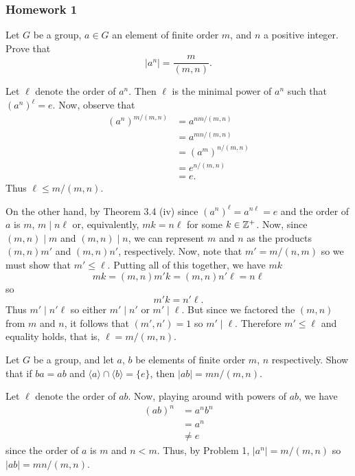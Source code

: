 \newpage

\subsubsection{Homework 1}
\setcounter{exercise}{0}
\setcounter{equation}{0}

\begin{problem}
  Let $G$ be a group, $a\in G$ an element of finite order $m$, and $n$ a
  positive integer. Prove that
  \[
    |a^n|=\frac{m}{(m,n)}.
  \]
\end{problem}
\begin{solution}
  Let $\ell$ denote the order of $a^n$. Then $\ell$ is the minimal power of
  $a^n$ such that ${(a^n)}^\ell=e$. Now, observe that
    \begin{align*}
      {(a^n)}^{m/(m,n)}
      &=a^{nm/(m,n)}\\
      &=a^{mn/(m,n)}\\
      &={(a^m)}^{n/(m,n)}\\
      &=e^{n/(m,n)}\\
      &=e.
    \end{align*}
  Thus $\ell\leq m/(m,n)$.

  On the other hand, by Theorem 3.4 (iv) since ${(a^n)}^\ell=a^{n\ell}=e$
  and the order of $a$ is $m$, $m\mid n\ell$ or, equivalently, $mk=n\ell$
  for some $k\in\mathbb{Z}^+$. Now, since $(m,n)\mid m$ and $(m,n)\mid n$, we can
  represent $m$ and $n$ as the products $(m,n)m'$ and $(m,n)n'$,
  respectively. Now, note that $m'=m/(n,m)$ so we must show that
  $m'\leq\ell$. Putting all of this together, we have $mk$
  \[
    mk=(m,n)m'k=(m,n)n'\ell=n\ell
  \]
  so
  \[
    m'k=n'\ell.
  \]
  Thus $m'\mid n'\ell$ so either $m'\mid n'$ or $m'\mid\ell$. But since we
  factored the $(m,n)$ from $m$ and $n$, it follows that $(m',n')=1$ so
  $m'\mid \ell$. Therefore $m'\leq\ell$ and equality holds, that is,
  $\ell=m/(m,n)$.
\end{solution}

\begin{problem}
  Let $G$ be a group, and let $a$, $b$ be elements of finite order $m$, $n$
  respectively. Show that if $ba=ab$ and
  $\langle a\rangle\cap\langle b\rangle=\{e\}$, then $|ab|=mn/(m,n)$.
\end{problem}
\begin{solution}
  Let $\ell$ denote the order of $ab$. Now, playing around with powers of
  $ab$, we have
  \begin{align*}
    (ab)^{n}
    &=a^nb^n\\
    &=a^n\\
    &\neq e
  \end{align*}
  since the order of $a$ is $m$ and $n<m$. Thus, by Problem 1,
  $|a^n|=m/(m,n)$ so $|ab|=mn/(m,n)$.
\end{solution}

